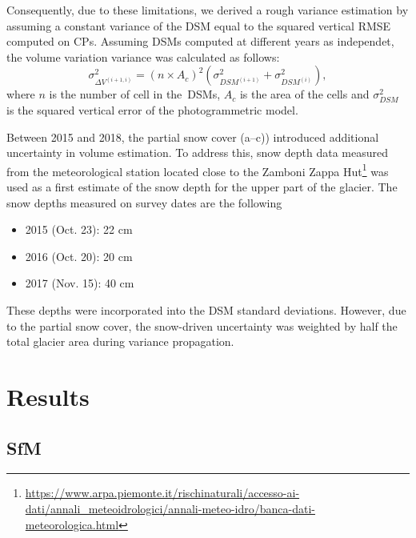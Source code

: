 Consequently, due to these limitations, we derived a rough variance estimation by
assuming a constant variance of the DSM equal to the squared vertical RMSE computed on CPs.
Assuming DSMs computed at different years as independet, the volume variation variance 
was calculated as follows:
\begin{equation}
    \sigma^2_{\Delta V^{(i+1,i)}}  = {(n \times A_c)}^2 \left( \sigma^2
    _{DSM^{(i+1)}} + \sigma^2_{DSM^{(i)}} \right),
    \label{eq:3:volVarProp}
\end{equation}
where $ n $ is the number of cell in the~DSMs, $A_c$ is the area of the cells
and $ \sigma^2 _{DSM}$ is the squared vertical error of the photogrammetric model.

Between 2015 and 2018, the partial snow cover (a--c)) introduced
additional uncertainty in volume estimation. 
To address this, snow depth data measured from the meteorological station located close 
to the Zamboni Zappa 
Hut\footnote{\url{https://www.arpa.piemonte.it/rischinaturali/accesso-ai-dati/annali_meteoidrologici/annali-meteo-idro/banca-dati-meteorologica.html}} 
was used as a first estimate of the snow depth for the upper part of the glacier. 
The snow depths measured on survey dates are the following
\begin{itemize}
    \item 2015 (Oct. 23): 22 cm
    \item 2016 (Oct. 20): 20 cm
    \item 2017 (Nov. 15): 40 cm
\end{itemize}
These depths were incorporated into the DSM standard deviations. 
However, due to the partial snow cover, the snow-driven uncertainty was weighted 
by half the total glacier area during variance propagation.


\section{Results}\label{sec:3:res}

\subsection{SfM}\label{sec:3:res:sfm}

